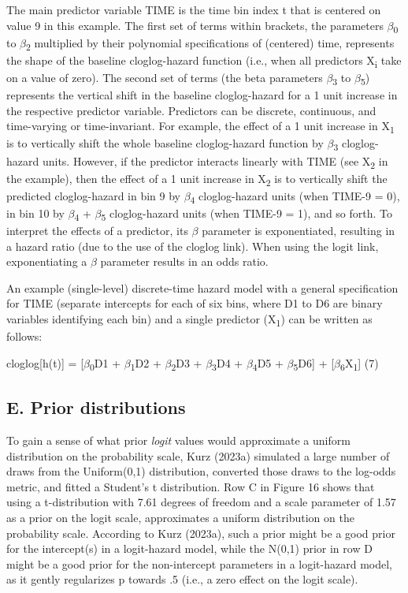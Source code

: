 \documentclass[
  man, donotrepeattitle,floatsintext]{apa6}
\begin{document}
The main predictor variable TIME is the time bin index t that is centered on value 9 in this example. The first set of terms within brackets, the parameters \(\beta\)\textsubscript{0} to \(\beta\)\textsubscript{2} multiplied by their polynomial specifications of (centered) time, represents the shape of the baseline cloglog-hazard function (i.e., when all predictors X\textsubscript{i} take on a value of zero). The second set of terms (the beta parameters \(\beta\)\textsubscript{3} to \(\beta\)\textsubscript{5}) represents the vertical shift in the baseline cloglog-hazard for a 1 unit increase in the respective predictor variable. Predictors can be discrete, continuous, and time-varying or time-invariant. For example, the effect of a 1 unit increase in X\textsubscript{1} is to vertically shift the whole baseline cloglog-hazard function by \(\beta\)\textsubscript{3} cloglog-hazard units. However, if the predictor interacts linearly with TIME (see X\textsubscript{2} in the example), then the effect of a 1 unit increase in X\textsubscript{2} is to vertically shift the predicted cloglog-hazard in bin 9 by \(\beta\)\textsubscript{4} cloglog-hazard units (when TIME-9 = 0), in bin 10 by \(\beta\)\textsubscript{4} + \(\beta\)\textsubscript{5} cloglog-hazard units (when TIME-9 = 1), and so forth. To interpret the effects of a predictor, its \(\beta\) parameter is exponentiated, resulting in a hazard ratio (due to the use of the cloglog link). When using the logit link, exponentiating a \(\beta\) parameter results in an odds ratio.

An example (single-level) discrete-time hazard model with a general specification for TIME (separate intercepts for each of six bins, where D1 to D6 are binary variables identifying each bin) and a single predictor (X\textsubscript{1}) can be written as follows:

\noindent cloglog{[}h(t){]} = {[}\(\beta\)\textsubscript{0}D1 + \(\beta\)\textsubscript{1}D2 + \(\beta\)\textsubscript{2}D3 + \(\beta\)\textsubscript{3}D4 + \(\beta\)\textsubscript{4}D5 + \(\beta\)\textsubscript{5}D6{]} + {[}\(\beta\)\textsubscript{6}X\textsubscript{1}{]} \hfill  (7)

\subsection{E. Prior distributions}\label{e.-prior-distributions}

To gain a sense of what prior \emph{logit} values would approximate a uniform distribution on the probability scale, Kurz (2023a) simulated a large number of draws from the Uniform(0,1) distribution, converted those draws to the log-odds metric, and fitted a Student's t distribution. Row C in Figure 16 shows that using a t-distribution with 7.61 degrees of freedom and a scale parameter of 1.57 as a prior on the logit scale, approximates a uniform distribution on the probability scale. According to Kurz (2023a), such a prior might be a good prior for the intercept(s) in a logit-hazard model, while the N(0,1) prior in row D might be a good prior for the non-intercept parameters in a logit-hazard model, as it gently regularizes p towards .5 (i.e., a zero effect on the logit scale).
\end{document}
